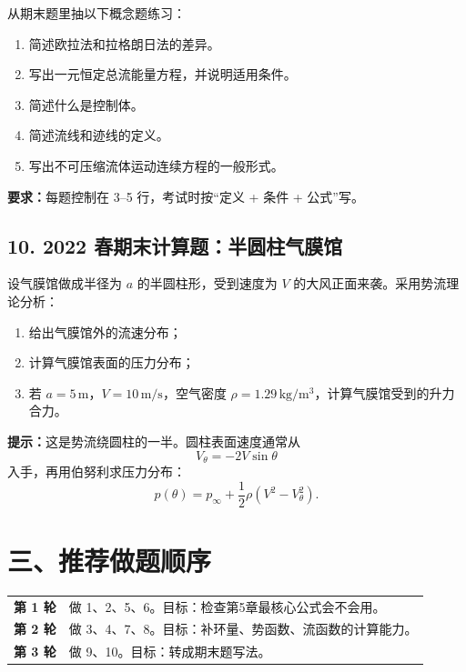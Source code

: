 ﻿\documentclass[UTF8,zihao=-4]{ctexart}
\newcommand{\task}[1]{\textbf{#1}}
\begin{document}
从期末题里抽以下概念题练习：

\begin{enumerate}[label=\arabic*.]
  \item 简述欧拉法和拉格朗日法的差异。
  \item 写出一元恒定总流能量方程，并说明适用条件。
  \item 简述什么是控制体。
  \item 简述流线和迹线的定义。
  \item 写出不可压缩流体运动连续方程的一般形式。
\end{enumerate}

\task{要求：}每题控制在 3--5 行，考试时按“定义 + 条件 + 公式”写。

\subsection*{10. 2022 春期末计算题：半圆柱气膜馆}

设气膜馆做成半径为 $a$ 的半圆柱形，受到速度为 $V$ 的大风正面来袭。采用势流理论分析：

\begin{enumerate}[label=(\alph*)]
  \item 给出气膜馆外的流速分布；
  \item 计算气膜馆表面的压力分布；
  \item 若 $a=5\,\mathrm{m}$，$V=10\,\mathrm{m/s}$，空气密度 $\rho=1.29\,\mathrm{kg/m^3}$，计算气膜馆受到的升力合力。
\end{enumerate}

\task{提示：}这是势流绕圆柱的一半。圆柱表面速度通常从
\[
V_\theta=-2V\sin\theta
\]
入手，再用伯努利求压力分布：
\[
p(\theta)=p_\infty+\frac{1}{2}\rho\left(V^2-V_\theta^2\right).
\]

\section*{三、推荐做题顺序}

\begin{tabular}{>{\bfseries}p{3cm}p{9.6cm}}
\toprule
第 1 轮 & 做 1、2、5、6。目标：检查第5章最核心公式会不会用。\\
第 2 轮 & 做 3、4、7、8。目标：补环量、势函数、流函数的计算能力。\\
第 3 轮 & 做 9、10。目标：转成期末题写法。\\
\bottomrule
\end{tabular}
\end{document}
